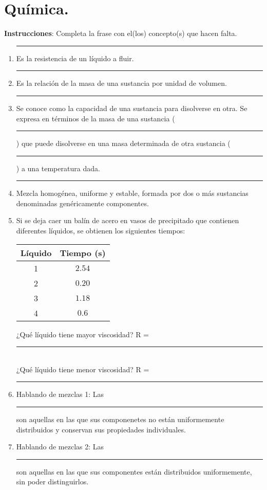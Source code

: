 \documentclass[12pt]{exam}
\begin{document}
\newpage

\section{Química.}

\textbf{Instrucciones}: Completa la frase con el(los) concepto(s) que hacen falta.

\begin{enumerate}
\item \rule{3cm}{0.1mm} Es la resistencia de un líquido a fluir.
\item \rule{3cm}{0.1mm} Es la relación de la masa de una sustancia por unidad de volumen.
\item \rule{3cm}{0.1mm} Se conoce como la capacidad de una sustancia para disolverse en otra. Se expresa en términos de la masa de una sustancia (\rule{3cm}{0.1mm}) que puede disolverse en una masa determinada de otra sustancia (\rule{3cm}{0.1mm}) a una temperatura dada.
\item \rule{3cm}{0.1mm} Mezcla homogénea, uniforme y estable, formada por dos o más sustancias denominadas genéricamente componentes.
\item Si se deja caer un balín de acero en vasos de precipitado que contienen diferentes líquidos, se obtienen los siguientes tiempos:
\begin{table}[H]
    \centering
    \begin{tabular}{c | c }
        Líquido & Tiempo (s) \\ \hline
        1 & $\num{2.54}$ \\ \hline
        2 & $\num{0.20}$ \\ \hline
        3 & $\num{1.18}$ \\ \hline
        4 & $\num{0.6}$ \\ \hline
    \end{tabular}
\end{table}
¿Qué líquido tiene mayor viscosidad? R = \rule{2cm}{0.1mm} \\
¿Qué líquido tiene menor viscosidad? R = \rule{2cm}{0.1mm}
\item Hablando de mezclas 1: Las \rule{3cm}{0.1mm} son aquellas en las que sus componenetes no están uniformemente distribuidos y conservan sus propiedades individuales.
\item Hablando de mezclas 2: Las \rule{3cm}{0.1mm} son aquellas en las que sus componentes están distribuidos uniformemente, sin poder distinguirlos.
\end{enumerate}
\end{document}
